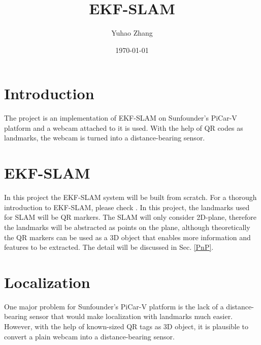 \documentclass[12pt]{article}
\title{EKF-SLAM}
\author{Yuhao Zhang}
\date{\today}
\begin{document}
\maketitle


%
\section{Introduction}
The project is an implementation of EKF-SLAM on Sunfounder's PiCar-V platform and a webcam attached to it is used. With the help of QR codes as landmarks, the webcam is turned into a distance-bearing sensor.
\section{EKF-SLAM}
In this project the EKF-SLAM system will be built from scratch. For a thorough introduction to EKF-SLAM, please check \cite{ekf}. In this project, the landmarks used for SLAM will be QR markers. The SLAM will only consider 2D-plane, therefore the landmarks will be abstracted as points on the plane, although theoretically the QR markers can be used as a 3D object that enables more information and features to be extracted. The detail will be discussed in Sec. {\ref{PnP}}.
\label{EKF}
\section{Localization}
One major problem for Sunfounder's PiCar-V platform is the lack of a distance-bearing sensor that would make localization with landmarks much easier. However, with the help of known-sized QR tags as 3D object, it is plausible to convert a plain webcam into a distance-bearing sensor.
\end{document}
